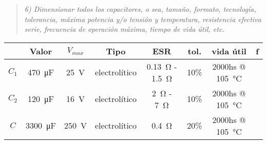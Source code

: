 \begin{quote} \textit{6) Dimensionar todos los capacitores, o sea, tamaño, formato, tecnología, tolerancia, máxima potencia y/o tensión y temperatura, resistencia efectiva serie, frecuencia de operación máxima, tiempo de vida útil, etc.}
\end{quote}
\begin{table}[H]
	\centering
	\begin{tabular}{cccccccc}
		\toprule
		& Valor & $V_{max}$ & Tipo & ESR & tol. & vida útil &f \\
		\midrule
		$C_1$ & \SI{470}{\micro\farad} & \SI{25}{\volt} & electrolítico & \SI{0.13}{\ohm} - \SI{1.5}{\ohm} & 10\% & 2000hs @ \SI{105}{\celsius} &  \\
		$C_2$ &\SI{120}{\micro\farad} & \SI{16}{\volt} & electrolítico & \SI{2}{\ohm} - \SI{7}{\ohm}& 10\% & 2000hs @ \SI{105}{\celsius} &\\
		$C$ &\SI{3300}{\micro\farad} & \SI{250}{\volt} & electrolítico & \SI{0.4}{\ohm} & 20\% &  2000hs @ \SI{105}{\celsius} & \\
		\bottomrule
	\end{tabular}
\end{table}
